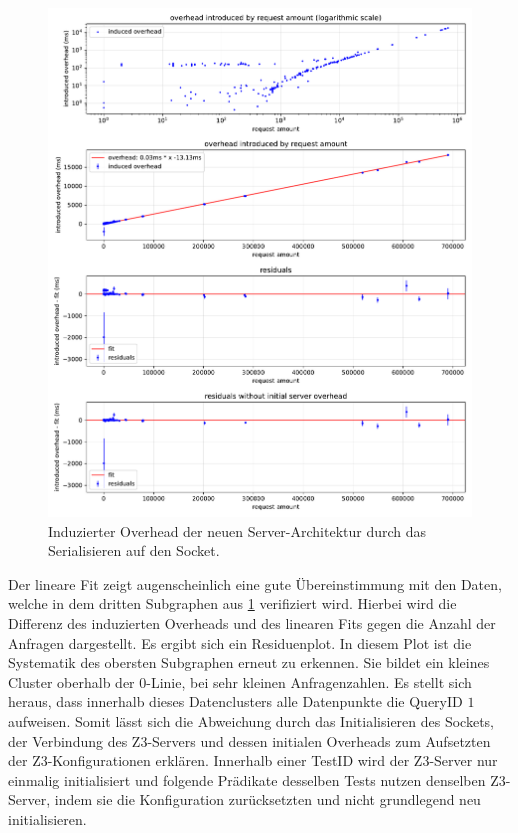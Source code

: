 \begin{figure}[!htp]
    \centering
    \includegraphics[scale=.55]{./PerformanceEvaluation/overhead.pdf}
    \caption{Induzierter Overhead der neuen Server-Architektur durch das Serialisieren auf den Socket.}
    \label{fig:overhead}
\end{figure}
\FloatBarrier
\clearpage

Der lineare Fit zeigt augenscheinlich eine gute Übereinstimmung mit den Daten, welche in dem dritten Subgraphen aus \cref{fig:overhead} verifiziert wird.
Hierbei wird die Differenz des induzierten Overheads und des linearen Fits gegen die Anzahl der Anfragen dargestellt.
Es ergibt sich ein Residuenplot.
In diesem Plot ist die Systematik des obersten Subgraphen erneut zu erkennen.
Sie bildet ein kleines Cluster oberhalb der $0$-Linie, bei sehr kleinen Anfragenzahlen.
Es stellt sich heraus, dass innerhalb dieses Datenclusters alle Datenpunkte die QueryID $1$ aufweisen.
Somit lässt sich die Abweichung durch das Initialisieren des Sockets, der Verbindung des Z3-Servers und dessen initialen Overheads zum Aufsetzten der Z3-Konfigurationen erklären.
Innerhalb einer TestID wird der Z3-Server nur einmalig initialisiert und folgende Prädikate desselben Tests nutzen denselben Z3-Server, indem sie die Konfiguration zurücksetzten und nicht grundlegend neu initialisieren.

